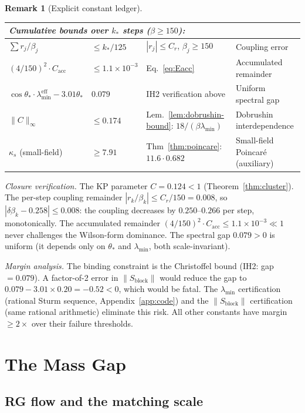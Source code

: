\documentclass[11pt]{article}
\theoremstyle{definition}
\newtheorem{remark}[theorem]{Remark}
\begin{document}
\begin{remark}[Explicit constant ledger]
\begin{center}
\begin{tabular}{lllp{5cm}}
\midrule
\multicolumn{4}{l}{\emph{Cumulative bounds over $k_*$ steps ($\beta\ge 150$):}}\\
\midrule
$\sum r_j/\beta_j$ & $\le k_*/125$ & $|r_j|\le C_r$, $\beta_j\ge 150$
& Coupling error\\
$(4/150)^2\cdot C_{\mathrm{acc}}$ & $\le 1.1\times 10^{-3}$ &
Eq.~\eqref{eq:Eacc}
& Accumulated remainder\\
$\cos\theta_*\cdot\lambda_{\min}^{\mathrm{eff}}
-3.01\theta_*$ & $0.079$ &
IH2 verification above
& Uniform spectral gap\\
$\|C\|_\infty$ & $\le 0.174$ & Lem.~\ref{lem:dobrushin-bound}:
$18/(\beta\lambda_{\min})$
& Dobrushin interdependence\\
$\kappa_s$ (small-field) & $\ge 7.91$ &
Thm~\ref{thm:poincare}: $11.6\cdot 0.682$
& Small-field Poincar\'e (auxiliary)\\
\bottomrule
\end{tabular}
\end{center}

\noindent\emph{Closure verification.}
The KP parameter $C=0.124<1$ (Theorem~\ref{thm:cluster}).
The per-step coupling remainder $|r_k/\beta_k|\le C_r/150=0.008$,
so $|\delta\beta_k-0.258|\le 0.008$: the coupling decreases by
$0.250$--$0.266$ per step, monotonically.
The accumulated remainder
$(4/150)^2\cdot C_{\mathrm{acc}}\le 1.1\times 10^{-3}\ll 1$
never challenges the Wilson-form dominance.
The spectral gap $0.079>0$ is uniform
(it depends only on $\theta_*$ and $\lambda_{\min}$, both
scale-invariant).

\emph{Margin analysis.}
The binding constraint is the Christoffel bound
(IH2: gap $=0.079$).  A factor-of-2 error in
$\|S_{\mathrm{block}}\|$ would reduce the gap to
$0.079-3.01\times 0.20=-0.52<0$, which would be fatal.
The $\lambda_{\min}$ certification
(rational Sturm sequence, Appendix~\ref{app:code}) and the
$\|S_{\mathrm{block}}\|$ certification
(same rational arithmetic) eliminate this risk.
All other constants have margin $\ge 2\times$
over their failure thresholds.
\end{remark}

\section{The Mass Gap}\label{sec:massgap}

\subsection{RG flow and the matching scale}
\end{document}
